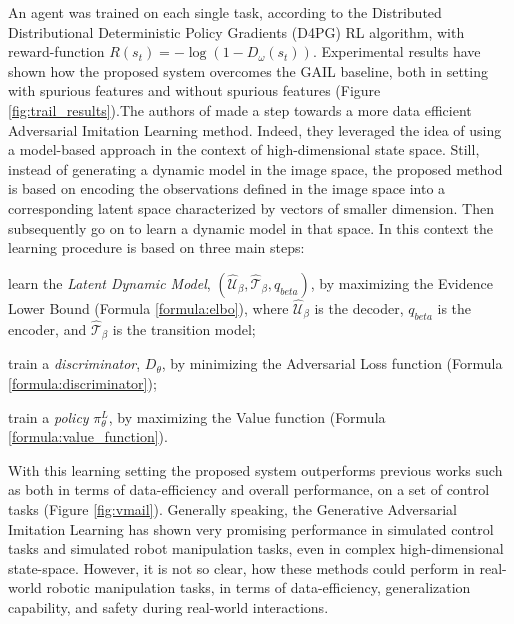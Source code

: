 An agent was trained on each single task, according to the Distributed Distributional Deterministic Policy Gradients (D4PG) \cite{barth2018d4pg} RL algorithm, with reward-function $R(s_{t}) = - \log(1-D_{\omega}(s_{t}))$. Experimental results have shown how the proposed system overcomes the GAIL \cite{ho2016gail} baseline, both in setting with spurious features and without spurious features (Figure \ref{fig:trail_results}).\unskip The authors of \cite{rafailov2021visual_ail} made a step towards a more data efficient Adversarial Imitation Learning method. Indeed, they leveraged the idea of using a model-based approach in the context of high-dimensional state space. Still, instead of generating a dynamic model in the image space, the proposed method is based on encoding the observations defined in the image space into a corresponding latent space characterized by vectors of smaller dimension. Then subsequently go on to learn a dynamic model in that space. In this context the learning procedure is based on three main steps: \begin{enumerate*}[label=\textbf{(\arabic*)}]
    \item learn the \textit{Latent Dynamic Model}, $(\hat{\mathcal{U}}_{\beta},\hat{\mathcal{T}}_{\beta}, q_{beta})$, by maximizing the Evidence Lower Bound (Formula \ref{formula:elbo}), where $\hat{\mathcal{U}}_{\beta}$ is the decoder, $q_{beta}$ is the encoder, and $\hat{\mathcal{T}}_{\beta}$ is the transition model;
    \item train a \textit{discriminator}, $D_{\theta}$, by minimizing the Adversarial Loss function (Formula \ref{formula:discriminator});
    \item train a \textit{policy} $\pi^{L}_{\theta}$, by maximizing the Value function (Formula \ref{formula:value_function}).
\end{enumerate*}
%

\noindent With this learning setting the proposed system outperforms previous works such as \cite{reddy2019sqil,kostrikov2018discriminator} both in terms of data-efficiency and overall performance, on a set of control tasks (Figure \ref{fig:vmail}). Generally speaking, the Generative Adversarial Imitation Learning has shown very promising performance in simulated control tasks and simulated robot manipulation tasks, even in complex high-dimensional state-space. However, it is not so clear, how these methods could perform in real-world robotic manipulation tasks, in terms of data-efficiency, generalization capability, and safety during real-world interactions.
